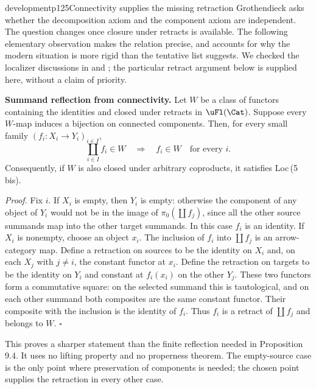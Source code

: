 \begin{dcomment}{development}{p125}{Connectivity supplies the missing retraction}
Grothendieck asks whether the decomposition axiom and the component axiom are independent. The question changes once closure under retracts is available. The following elementary observation makes the relation precise, and accounts for why the modern situation is more rigid than the tentative list suggests. We checked the localizer discussions in \citet[\S2.1 and \S2.4]{Maltsiniotis2020} and \citet[\S9.3]{Cisinski2006}; the particular retract argument below is supplied here, without a claim of priority.

\textbf{Summand reflection from connectivity.}\ours
Let $W$ be a class of functors containing the identities and closed under retracts in $\uFl(\Cat)$. Suppose every $W$-map induces a bijection on connected components. Then, for every small family $(f_i:X_i\longrightarrow Y_i)_{i\in I}$,
\[
 \coprod_{i\in I}f_i\in W\quad\Longrightarrow\quad f_i\in W
 \quad\text{for every }i.
\]
Consequently, if $W$ is also closed under arbitrary coproducts, it satisfies Loc\,(5\,bis).

\emph{Proof.} Fix $i$. If $X_i$ is empty, then $Y_i$ is empty: otherwise the component of any object of $Y_i$ would not be in the image of $\pi_0(\coprod f_j)$, since all the other source summands map into the other target summands. In this case $f_i$ is an identity. If $X_i$ is nonempty, choose an object $x_i$. The inclusion of $f_i$ into $\coprod f_j$ is an arrow-category map. Define a retraction on sources to be the identity on $X_i$ and, on each $X_j$ with $j\ne i$, the constant functor at $x_i$. Define the retraction on targets to be the identity on $Y_i$ and constant at $f_i(x_i)$ on the other $Y_j$. These two functors form a commutative square: on the selected summand this is tautological, and on each other summand both composites are the same constant functor. Their composite with the inclusion is the identity of $f_i$. Thus $f_i$ is a retract of $\coprod f_j$ and belongs to $W$. \hfill$\square$

This proves a sharper statement than the finite reflection needed in Proposition 9.4. It uses no lifting property and no properness theorem. The empty-source case is the only point where preservation of components is needed; the chosen point supplies the retraction in every other case.


\end{dcomment}
